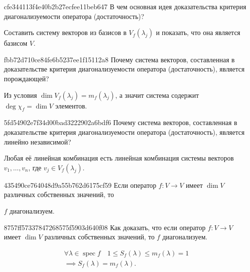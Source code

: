 \begin{note}{cfe344113f4e40b2b27ecfee11beb647}
    В чем основная идея доказательства критерия диагонализуемости оператора (достаточность)?

    \begin{cloze}{1}
        Составить систему векторов из базисов в \( V_f (\lambda_j) \) и показать, что она является базисом \( V \).
    \end{cloze}
\end{note}

\begin{note}{fbb72d710ce84fe6b5237ee1f15112a8}
    Почему система векторов, составленная в доказательстве критерия диагонализуемости оператора (достаточность), является порождающей?

    \begin{cloze}{1}
        Из условия \( \dim V_f (\lambda_j) = m_f (\lambda_j) \), а значит система содержит \( \deg \chi_f = \dim V \) элементов.
    \end{cloze}
\end{note}

\begin{note}{5fd54902e7f34d00bad3222902a6bdf6}
    Почему система векторов, составленная в доказательстве критерия диагонализуемости оператора (достаточность), является линейно независимой?

    \begin{cloze}{1}
        Любая её линейная комбинация есть линейная комбинация системы векторов \( v_1, \ldots, v_n \), где \( v_j \in V_f (\lambda_j) \).
    \end{cloze}
\end{note}

\begin{note}{435490ce764048d9a55b762d6175cf59}
    Если оператор \( f : V  \to V \) имеет \( \dim V \) различных собственных значений, то \begin{icloze}{1}\( f \) диагонализуем.\end{icloze}
\end{note}

\begin{note}{8757ff57337847268575f5903d640f08}
    Как доказать, что если оператор \( f : V \to V \) имеет \( \dim V \) различных собственных значений, то \( f \) диагонализуем.

    \begin{cloze}{1}
        \begin{multline*}
            \forall \lambda \in \operatorname{spec} f \quad 1 \leqslant S_f(\lambda) \leqslant m_f(\lambda) = 1 \\
            \implies  S_f (\lambda) = m_f (\lambda).
        \end{multline*}
    \end{cloze}
\end{note}


